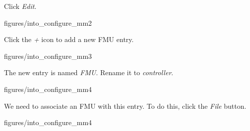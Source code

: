 \documentclass[11pt,a4paper]{../tutorial}
\begin{document}
\begin{instructions}
\item Click \emph{Edit}.

    \begin{annotation}[width=0.8\linewidth,trim=0 0 0 250,clip]{figures/into_configure_mm2}
    \end{annotation}

\item Click the \emph{+} icon to add a new FMU entry.

    \begin{annotation}[width=0.8\linewidth,trim=0 120 0 250,clip]{figures/into_configure_mm3}
    \end{annotation}

\item The new entry is named \emph{FMU}. Rename it to \emph{controller}.

    \begin{annotation}[width=0.8\linewidth,trim=0 0 0 250,clip]{figures/into_configure_mm4}
    \end{annotation}

\item We need to associate an FMU with this entry. To do this, click the \emph{File} button.

    \begin{annotation}[width=0.8\linewidth,trim=0 0 0 250,clip]{figures/into_configure_mm4}
    \end{annotation}



\end{instructions}
\end{document}
